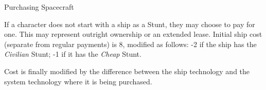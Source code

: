 \begin{sidebox}{Purchasing Spacecraft}

If a character does not start with a ship as a Stunt, they may choose to pay for one. This may represent outright ownership or an extended lease. Initial ship cost (separate from regular payments) is 8, modified as follows: -2 if the ship has the \emph{Civilian} Stunt; -1 if it has the \emph{Cheap} Stunt.

Cost is finally modified by the difference between the ship technology and the system technology where it is being purchased.
\end{sidebox}
